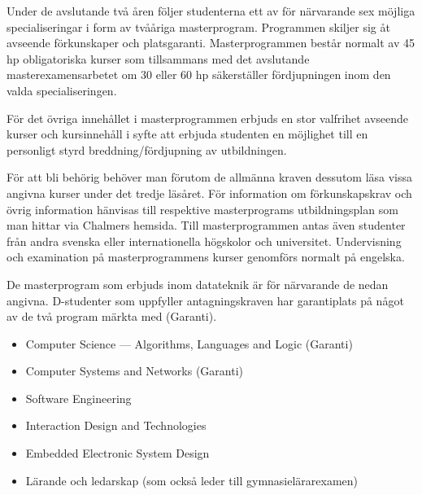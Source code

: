 \documentclass[twocolumn]{article}
\begin{document}
Under de avslutande två åren följer studenterna ett av för närvarande
sex möjliga specialiseringar i form av tvååriga masterprogram.
Programmen skiljer sig åt avseende förkunskaper och platsgaranti.
Masterprogrammen består normalt av 45 hp obligatoriska kurser som
tillsammans med det avslutande masterexamensarbetet om 30 eller 60 hp
säkerställer fördjupningen inom den valda specialiseringen.

För det övriga innehållet i masterprogrammen erbjuds en stor valfrihet
avseende kurser och kursinnehåll i syfte att erbjuda studenten en
möjlighet till en personligt styrd breddning/fördjupning av
utbildningen. 

För att bli behörig behöver man förutom de allmänna kraven dessutom
läsa vissa angivna kurser under det tredje läsåret. För information om
förkunskapskrav och övrig information hänvisas till respektive
masterprograms utbildningsplan som man hittar via Chalmers
hemsida. Till masterprogrammen antas även studenter från andra svenska
eller internationella högskolor och universitet.  Undervisning och
examination på masterprogrammens kurser genomförs normalt på engelska.

De masterprogram som erbjuds inom datateknik är för närvarande de
nedan angivna. D-studenter som uppfyller antagningskraven har
garantiplats på något av de två program märkta med (Garanti).

\begin{itemize}
\item \foreignlanguage{english}{Computer Science --- Algorithms,
    Languages and Logic} (Garanti)
\item \foreignlanguage{english}{Computer Systems and Networks} (Garanti)
\item \foreignlanguage{english}{Software Engineering}
\item \foreignlanguage{english}{Interaction Design and Technologies}
\item \foreignlanguage{english}{Embedded Electronic System Design}
\item Lärande och ledarskap (som också leder till gymnasielärarexamen)
\end{itemize}
\end{document}

